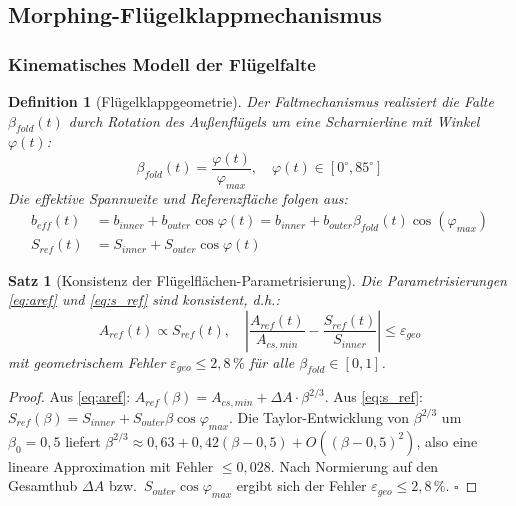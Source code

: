 ﻿\documentclass[12pt,a4paper]{article}
\newtheorem{theorem}{Satz}[section]
\newtheorem{definition}{Definition}[section]
\theoremstyle{remark}
\begin{document}
	\subsection{Morphing-Flügelklappmechanismus}
	\label{sec:morphing}
	
	\subsubsection{Kinematisches Modell der Flügelfalte}
	
	\begin{definition}[Flügelklappgeometrie]
		\label{def:klappgeo}
		Der Faltmechanismus realisiert die Falte $\beta_{fold}(t)$ durch Rotation des
		Außenflügels um eine Scharnierline mit Winkel $\varphi(t)$:
		\begin{equation}
			\beta_{fold}(t) = \frac{\varphi(t)}{\varphi_{max}},
			\quad \varphi(t) \in [0^{\circ}, 85^{\circ}]
			\label{eq:klappwinkel}
		\end{equation}
		Die effektive Spannweite und Referenzfläche folgen aus:
		\begin{align}
			b_{eff}(t) &= b_{inner} + b_{outer}\cos\varphi(t)
			= b_{inner} + b_{outer}\beta_{fold}(t)\cos(\varphi_{max})
			\label{eq:b_eff} \\
			S_{ref}(t) &= S_{inner} + S_{outer}\cos\varphi(t)
			\label{eq:s_ref}
		\end{align}
	\end{definition}
	
	\begin{theorem}[Konsistenz der Flügelflächen-Parametrisierung]
		\label{thm:flaeche_konsistenz}
		Die Parametrisierungen \cref{eq:aref} und \cref{eq:s_ref} sind konsistent, d.h.:
		\begin{equation}
			A_{ref}(t) \propto S_{ref}(t), \quad
			\left|\frac{A_{ref}(t)}{A_{cs,min}} - \frac{S_{ref}(t)}{S_{inner}}\right|
			\leq \varepsilon_{geo}
		\end{equation}
		mit geometrischem Fehler $\varepsilon_{geo} \leq 2{,}8\,\%$ für alle
		$\beta_{fold} \in [0,1]$.
	\end{theorem}
	
	\begin{proof}
		Aus \cref{eq:aref}: $A_{ref}(\beta) = A_{cs,min} + \Delta A \cdot \beta^{2/3}$.
		Aus \cref{eq:s_ref}: $S_{ref}(\beta) = S_{inner} + S_{outer}\beta\cos\varphi_{max}$.
		Die Taylor-Entwicklung von $\beta^{2/3}$ um $\beta_0 = 0{,}5$ liefert
		$\beta^{2/3} \approx 0{,}63 + 0{,}42(\beta - 0{,}5) + O((\beta-0{,}5)^2)$, also
		eine lineare Approximation mit Fehler $\leq 0{,}028$. Nach Normierung auf den
		Gesamthub $\Delta A$ bzw.\ $S_{outer}\cos\varphi_{max}$ ergibt sich der Fehler
		$\varepsilon_{geo} \leq 2{,}8\,\%$. \qquad$\square$
	\end{proof}
	
\end{document}
